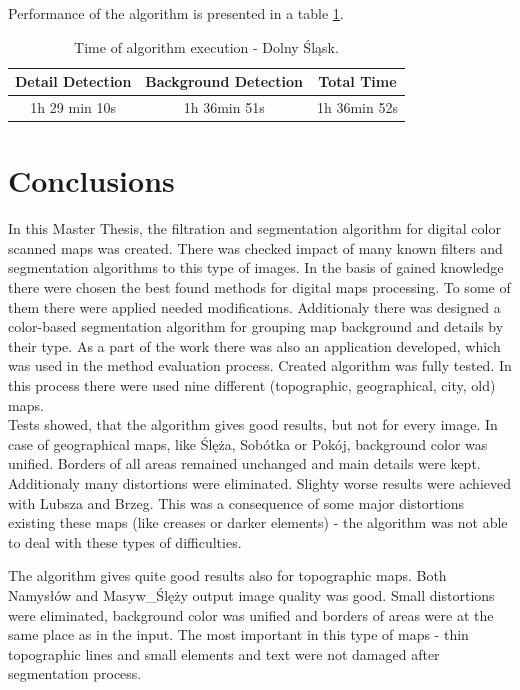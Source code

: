 \documentclass[a4paper,onecolumn,oneside,12pt]{memoir}
\begin{document}
\newpage

Performance of the algorithm is presented in a table \ref{dolnySlaskPerformance}.

\begin{table}[!ht]
\begin{center}
\caption{Time of algorithm execution - Dolny Śląsk.}
\label{dolnySlaskPerformance}
\begin{tabular}{|c|c|c|}
  \hline
  Detail Detection & Background Detection & Total Time \\
  \hline
  1h 29 min 10s & 1h 36min 51s & 1h 36min 52s \\
  \hline
\end{tabular}
\end{center}
\end{table}

\chapter{Conclusions}

In this Master Thesis, the filtration and segmentation algorithm for digital color scanned maps was
created. There was checked impact of many known filters and segmentation algorithms to this type of
images. In the basis of gained knowledge there were chosen the best found methods for digital maps
processing. To some of them there were applied needed modifications. Additionaly there was designed
a color-based segmentation algorithm for grouping map background and details by their type. As a
part of the work there was also an application developed, which was used in the method evaluation
process. Created algorithm was fully tested. In this process there were used nine different
 (topographic, geographical, city, old) maps. \\

Tests showed, that the algorithm gives good results, but not for every image. In case of 
geographical maps, like Ślęża, Sobótka or Pokój, background color was unified. Borders of all areas
remained unchanged and main details were kept. Additionaly many distortions were eliminated. Slighty
worse results were achieved with Lubsza and Brzeg. This was a consequence of some major distortions
existing these maps (like creases or darker elements) - the algorithm was not able to deal with these
types of difficulties. 

The algorithm gives quite good results also for topographic maps. Both
Namysłów and Masyw\_Ślęży output image quality was good. Small distortions were eliminated,
background color was unified and borders of areas were at the same place as in the input. The most
important in this type of maps - thin topographic lines and small elements and text were not damaged
after segmentation process.
\end{document}
